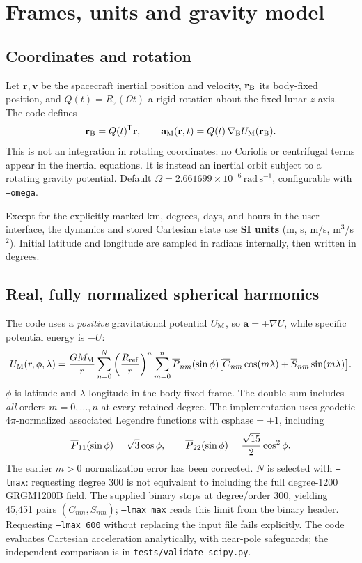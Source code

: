 \documentclass[11pt,a4paper]{article}
\newcommand{\opt}[1]{\texttt{#1}}
\newcommand{\pathcode}[1]{\nolinkurl{#1}}
\newcommand{\unit}[1]{\,\mathrm{#1}}
\begin{document}
\section{Frames, units and gravity model}
\subsection{Coordinates and rotation}
Let \(\mathbf r,\mathbf v\) be the spacecraft inertial position and velocity, \(\mathbf r_{\rm B}\) its body-fixed position, and \(Q(t)=R_z(\Omega t)\) a rigid rotation about the fixed lunar \(z\)-axis. The code defines
\begin{equation}
\mathbf r_{\rm B}=Q(t)^{\mathsf T}\mathbf r,\qquad
\mathbf a_{\rm M}(\mathbf r,t)=Q(t)\,\nabla_{\rm B}U_{\rm M}(\mathbf r_{\rm B}).
\label{eq:lunaracc}
\end{equation}
This is not an integration in rotating coordinates: no Coriolis or centrifugal terms appear in the inertial equations. It is instead an inertial orbit subject to a rotating gravity potential. Default \(\Omega=2.661699\times10^{-6}\unit{rad\,s^{-1}}\), configurable with \opt{--omega}.

Except for the explicitly marked km, degrees, days, and hours in the user interface, the dynamics and stored Cartesian state use \textbf{SI units} (m, s, m/s, m\(^3\)/s\(^2\)). Initial latitude and longitude are sampled in radians internally, then written in degrees.

\subsection{Real, fully normalized spherical harmonics}
The code uses a \emph{positive} gravitational potential \(U_{\rm M}\), so \(\mathbf a=+\nabla U\), while specific potential energy is \(-U\):
\begin{align}
U_{\rm M}(r,\phi,\lambda)
={GM_{\rm M}\over r}\sum_{n=0}^{N}\left({R_{\rm ref}\over r}\right)^n
\sum_{m=0}^{n}\overline P_{nm}(\sin\phi)
\big[\overline C_{nm}\cos(m\lambda)+\overline S_{nm}\sin(m\lambda)\big].
\label{eq:harmonic}
\end{align}
\(\phi\) is latitude and \(\lambda\) longitude in the body-fixed frame. The double sum includes \emph{all} orders \(m=0,\ldots,n\) at every retained degree. The implementation uses geodetic \(4\pi\)-normalized associated Legendre functions with \(\mathrm{csphase}=+1\), including
\[
\overline P_{11}(\sin\phi)=\sqrt3\cos\phi,\qquad
\overline P_{22}(\sin\phi)={\sqrt{15}\over2}\cos^2\phi.
\]
The earlier \(m>0\) normalization error has been corrected. \(N\) is selected with \opt{--lmax}: requesting degree 300 is not equivalent to including the full degree-1200 GRGM1200B field. The supplied binary stops at degree/order 300, yielding 45,451 pairs $({\overline C}_{nm},{\overline S}_{nm})$; \opt{--lmax max} reads this limit from the binary header. Requesting \opt{--lmax 600} without replacing the input file fails explicitly. The code evaluates Cartesian acceleration analytically, with near-pole safeguards; the independent comparison is in \pathcode{tests/validate_scipy.py}.
\end{document}
